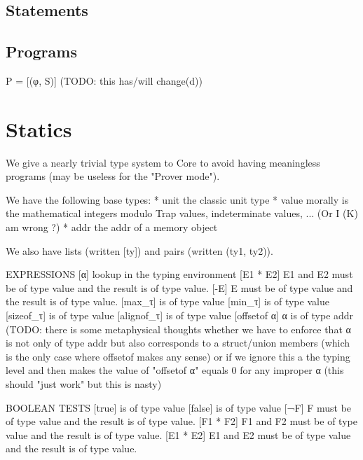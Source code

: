 \documentclass[12pt, a4paper]{article}
\begin{document}
\subsection{Statements}
\ottgrammartabular{
  \ottp\ottinterrule
  \ottS\ottafterlastrule
}







\subsection{Programs}
{\color{orange} P = [(φ, S)] (TODO: this has/will change(d))}

\section{Statics}
  We give a nearly trivial type system to Core to avoid having meaningless
  programs (may be useless for the "Prover mode").
  
  We have the following base types:
    * unit    the classic unit type
    * value   morally is the mathematical integers modulo Trap values,
              indeterminate values, ... (Or I (K) am wrong ?)
    * addr    the addr of a memory object
  
  We also have lists (written [ty]) and pairs (written (ty1, ty2)).
  
  EXPRESSIONS
    [α]           lookup in the typing environment
    [E1 * E2]     E1 and E2 must be of type value and the result is of type
                  value.
    [-E]          E must be of type value and the result is of type value.
    [max\_τ]       is of type value
    [min\_τ]       is of type value
    [sizeof\_τ]    is of type value
    [alignof\_τ]   is of type value
    [offsetof α]  α is of type addr (TODO: there is some metaphysical thoughts
                  whether we have to enforce that α is not only of type addr but
                  also corresponds to a struct/union members (which is the only
                  case where offsetof makes any sense) or if we ignore this a
                  the typing level and then makes the value of "offsetof α"
                  equals 0 for any improper α (this should "just work" but this
                  is nasty)
  
  BOOLEAN TESTS
    [true]        is of type value
    [false]       is of type value
    [¬F]          F must be of type value and the result is of type value.
    [F1 * F2]     F1 and F2 must be of type value and the result is of type value.
    [E1 * E2]     E1 and E2 must be of type value and the result is of type value.
  
\end{document}

